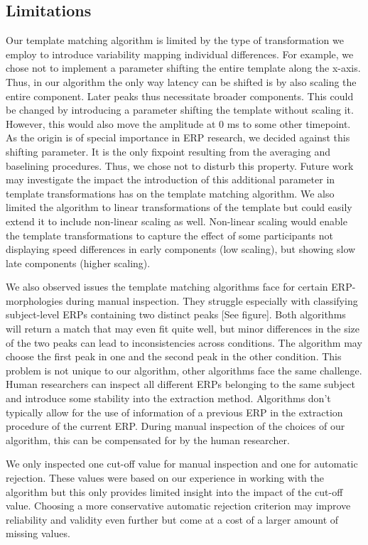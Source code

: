\documentclass[
  man]{apa7}
\begin{document}
\hypertarget{limitations}{%
\subsection{Limitations}\label{limitations}}

Our template matching algorithm is limited by the type of transformation we employ to introduce variability mapping individual differences. For example, we chose not to implement a parameter shifting the entire template along the x-axis. Thus, in our algorithm the only way latency can be shifted is by also scaling the entire component. Later peaks thus necessitate broader components. This could be changed by introducing a parameter shifting the template without scaling it. However, this would also move the amplitude at 0 ms to some other timepoint. As the origin is of special importance in ERP research, we decided against this shifting parameter. It is the only fixpoint resulting from the averaging and baselining procedures. Thus, we chose not to disturb this property. Future work may investigate the impact the introduction of this additional parameter in template transformations has on the template matching algorithm. We also limited the algorithm to linear transformations of the template but could easily extend it to include non-linear scaling as well. Non-linear scaling would enable the template transformations to capture the effect of some participants not displaying speed differences in early components (low scaling), but showing slow late components (higher scaling).

We also observed issues the template matching algorithms face for certain ERP-morphologies during manual inspection. They struggle especially with classifying subject-level ERPs containing two distinct peaks {[}See figure{]}. Both algorithms will return a match that may even fit quite well, but minor differences in the size of the two peaks can lead to inconsistencies across conditions. The algorithm may choose the first peak in one and the second peak in the other condition. This problem is not unique to our algorithm, other algorithms face the same challenge. Human researchers can inspect all different ERPs belonging to the same subject and introduce some stability into the extraction method. Algorithms don't typically allow for the use of information of a previous ERP in the extraction procedure of the current ERP. During manual inspection of the choices of our algorithm, this can be compensated for by the human researcher.

We only inspected one cut-off value for manual inspection and one for automatic rejection. These values were based on our experience in working with the algorithm but this only provides limited insight into the impact of the cut-off value. Choosing a more conservative automatic rejection criterion may improve reliability and validity even further but come at a cost of a larger amount of missing values.
\end{document}
